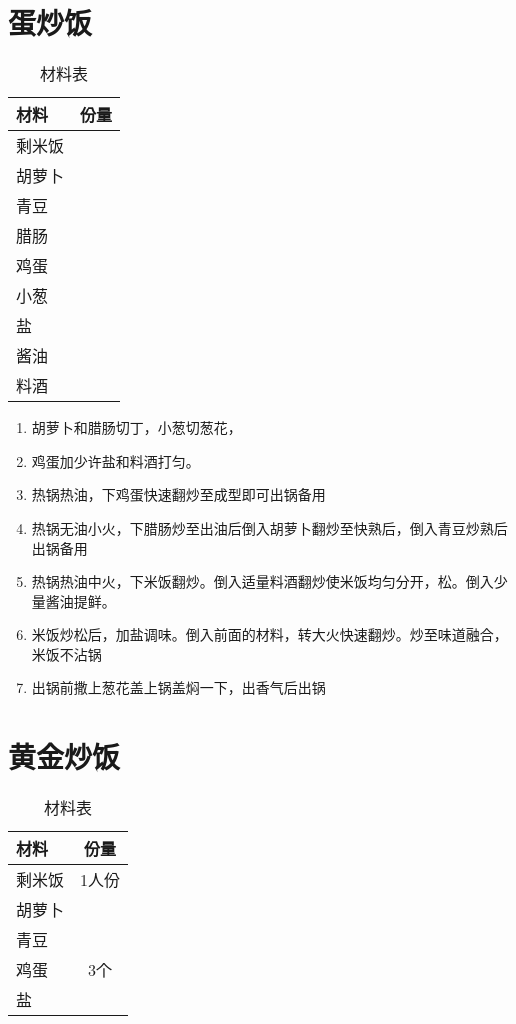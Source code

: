 \section{蛋炒饭}

\begin{table}[H]
    \centering
    \begin{tabular}{|l||c|}\hline
     \textbf{材料}    &  \textbf{份量}\\ \hline\hline
    剩米饭   &   \\ \hline
    胡萝卜    &  \\ \hline
    青豆 & \\ \hline 
    腊肠 & \\ \hline 
    鸡蛋 &  \\ \hline
    小葱 & \\ \hline
    盐 & \\ \hline 
    酱油 &  \\ \hline 
    料酒 & \\ \hline 
    \end{tabular}
    \caption{材料表}
\end{table}

\begin{enumerate}
    \item 胡萝卜和腊肠切丁，小葱切葱花，
    \item 鸡蛋加少许盐和料酒打匀。
    \item 热锅热油，下鸡蛋快速翻炒至成型即可出锅备用
    \item 热锅无油小火，下腊肠炒至出油后倒入胡萝卜翻炒至快熟后，倒入青豆炒熟后出锅备用
    \item 热锅热油中火，下米饭翻炒。倒入适量料酒翻炒使米饭均匀分开，松。倒入少量酱油提鲜。
    \item 米饭炒松后，加盐调味。倒入前面的材料，转大火快速翻炒。炒至味道融合，米饭不沾锅
    \item 出锅前撒上葱花盖上锅盖焖一下，出香气后出锅
\end{enumerate}


\section{黄金炒饭}

\begin{table}[H]
    \centering
    \begin{tabular}{|l||c|}\hline
     \textbf{材料}    &  \textbf{份量}\\ \hline\hline
    剩米饭   &  1人份 \\ \hline
    胡萝卜    &  \\ \hline
    青豆 & \\ \hline 
    鸡蛋 &  3个\\ \hline
    盐 & \\ \hline 
    \end{tabular}
    \caption{材料表}
\end{table}

